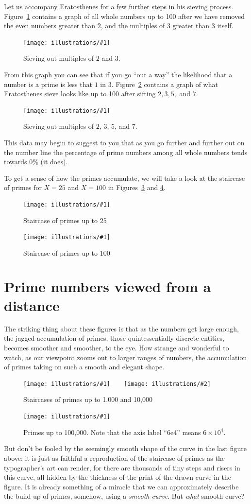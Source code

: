 \documentclass[openany]{book}
\newcommand{\ill}[3]{%
   \begin{figure}[H]%
   \vspace{-2ex}
   \centering%
   \texttt{[image: illustrations/\#1]}%
   \caption{#3}%
   \vspace{-2ex}
    \end{figure}}
\newcommand{\illtwo}[4]{%
   \begin{figure}[H]\centering%
   \texttt{[image: illustrations/\#1]}$\qquad$\texttt{[image: illustrations/\#2]}%
   \caption{#4}%
    \end{figure}}
\theoremstyle{plain}
\theoremstyle{definition}
\begin{document}
Let us accompany Eratosthenes for a few further steps in his sieving
process.  Figure~\ref{fig:sieve3_100} contains a graph of all whole
numbers up to 100 after we have removed the even numbers greater than
$2$, and the multiples of $3$ greater than $3$ itself.


\ill{sieves3_100}{.7}{Sieving out multiples of $2$ and $3$.\label{fig:sieve3_100}}


From this graph you can see that if you go ``out a way'' the
likelihood that a number is a prime is less that $1$ in $3
$. Figure~\ref{fig:sieve7_100} contains a graph of what Eratosthenes
sieve looks like up to 100 after sifting $2,3,5,$ and $7$.



\ill{sieves7_100}{.7}{Sieving out multiples of $2$, $3$, $5$, and $7$.\label{fig:sieve7_100}}


This data may begin to suggest to you that as you go further and
further out on the number line the percentage of prime numbers among
all whole numbers tends towards $0\%$ (it does).


To get a sense of how the primes accumulate, we will take a look at
the staircase of primes for $X= 25$ and $X=100$ in Figures~\ref{fig:staircase25}
and \ref{fig:staircase100a}.

\ill{prime_pi_25_aspect1}{.8}{Staircase of primes up to 25\label{fig:staircase25}}
\ill{prime_pi_100_aspect1}{.8}{Staircase of primes up to 100\label{fig:staircase100a}}



\chapter{Prime numbers viewed from a distance}
The striking thing about these figures is that as the numbers get
large enough, the jagged accumulation of primes, those
quintessentially discrete entities, becomes smoother and smoother, to
the eye. How strange and wonderful to watch, as our viewpoint zooms
out to larger ranges of numbers, the accumulation of primes taking on
such a smooth and elegant shape.

\illtwo{prime_pi_1000}{prime_pi_10000}{0.4}{Staircases of primes up to 1,000 and 10,000\label{fig:staircases2}}

\ill{prime_pi_100000}{.8}{Primes up to 100,000\label{fig:pn100000}.
Note that the axis label ``6e4'' means $6 \times 10^4$.}



But don't be fooled by the seemingly smooth shape of the curve in the
last figure above: it is just as faithful a reproduction of the
staircase of primes as the typographer's art can render, for there are
thousands of tiny steps and risers in this curve, all hidden by the
thickness of the print of the drawn curve in the figure.  It is
already something of a miracle that we can approximately describe the
build-up of primes, somehow, using a {\em smooth curve}.  But {\em
  what} smooth curve?
\end{document}
